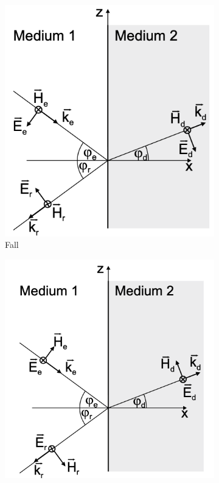 \begin{figure}
    \centering
    \begin{subfigure}[c]{0.3\textwidth}
        \includegraphics[width=\textwidth]{Abbildungen/Kapitel2/Wellenreflektion_Fall1.png}
        \caption{Fall \label{subfig:2_Wellenreflektion_Fall1}}
    \end{subfigure}
    \hspace{0.2cm}
    \begin{subfigure}[c]{0.3\textwidth}
        \includegraphics[width=\textwidth]{Abbildungen/Kapitel2/Wellenreflektion_Fall2.png}

\end{subfigure}
\end{figure}
